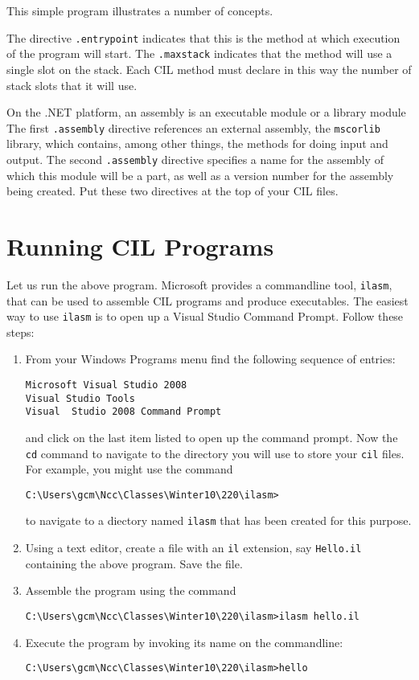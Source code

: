 \documentclass[10pt,a4paper]{amsart}
\begin{document}
This simple program illustrates a number of concepts.


The  directive {\tt .entrypoint} indicates that this is the method at which
execution of the program will start.  The {\tt .maxstack} indicates that 
the method will use a single slot on the stack.  Each CIL method must declare
in this way the number of stack slots that it will use.

On the .NET platform, an assembly is an executable module or a library module
The first {\tt .assembly} directive
references an external assembly, the {\tt mscorlib} library, which contains, among
other things, the methods for doing input and output. The second {\tt.assembly}
directive specifies a name for the assembly of which this module will be a part, as well as a version
number for the assembly being created. Put these two directives at the top of your CIL files.

\section{Running CIL Programs}


Let us run the above program. 
Microsoft provides a commandline tool, {\tt ilasm}, that can be used to assemble 
CIL programs and produce executables. The easiest way to use {\tt ilasm} is 
to open up a Visual Studio Command Prompt. Follow these steps:
\begin{enumerate}
\item  From your Windows Programs menu find the following sequence of entries:
\begin{verbatim}
Microsoft Visual Studio 2008
Visual Studio Tools
Visual  Studio 2008 Command Prompt
\end{verbatim}
and click on the last item listed to open up the command prompt. Now the {\tt cd}
command to navigate to the directory you will use to store your {\tt cil} files.
For example, you might use 
the command

\begin{verbatim}
C:\Users\gcm\Ncc\Classes\Winter10\220\ilasm>
\end{verbatim}
to navigate to a diectory named {\tt ilasm} that has been created for this purpose.

\item Using a text editor, create a file with an {\tt il} extension, say {\tt Hello.il} 
containing the above program. Save the file.

\item Assemble the program using the command
\begin{verbatim}
C:\Users\gcm\Ncc\Classes\Winter10\220\ilasm>ilasm hello.il
\end{verbatim}

\item Execute the program by invoking its name on the commandline:
\begin{verbatim}
C:\Users\gcm\Ncc\Classes\Winter10\220\ilasm>hello
\end{verbatim}
\end{enumerate}
\end{document}
